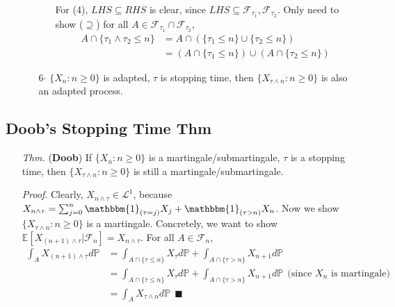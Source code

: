 \documentclass[a4paper,12pt,twoside]{book}
\begin{document}
\begin{itemize}
\begin{itemize}
\begin{itemize}
			For (4), $LHS \subseteq RHS$ is clear, since $LHS \subseteq \mathcal{F}_{\tau_1}, \mathcal{F}_{\tau_2}$. Only need to show ($\supseteq$) for all $A \in \mathcal{F}_{\tau_1}\cap \mathcal{F}_{\tau_2}$, 
			\begin{equation}
				\begin{split}
					A \cap \{\tau_1 \wedge \tau_2\leq n\}&=A \cap (\{\tau_1\leq n\}\cup \{\tau_2\leq n\})\\
					&= (A\cap \{\tau_1\leq n\}) \cup (A\cap\{\tau_2 \leq n\})
				\end{split}
			\end{equation}
		\end{itemize}
		\item[6$\cdot$] $\{X_n: n\geq 0\}$ is adapted, $\tau$ is stopping time, then $\{X_{\tau \wedge n}: n\geq 0\}$ is also an adapted process.
	\end{itemize}
\end{itemize}

\subsection{Doob's Stopping Time Thm}
\begin{itemize}
	\item[\textit{Thm.}] (\textbf{Doob}) If $\{X_n: n\geq 0\}$ is a martingale/submartingale, $\tau$ is a stopping time, then $\{X_{\tau \wedge n}: n\geq 0\}$ is still a martingale/submartingale.

	\item[\textit{Proof}.] Clearly, $X_{n \wedge \tau}\in \mathcal{L}^1$, because $X_{n \wedge \tau}=\sum_{j=0}^n \mathbbm{1}_{(\tau=j)}X_j+\mathbbm{1}_{(\tau>n)}X_n$. Now we show $\{X_{\tau \wedge n}: n\geq 0\}$ is a martingale. Concretely, we want to show $\mathbb{E}\left[X_{(n+1)\wedge \tau}|\mathcal{F}_n\right]=X_{n \wedge \tau}$. For all $A \in \mathcal{F}_n$,
	\begin{equation}
		\begin{split}
			\int_A X_{(n+1) \wedge \tau} d\mathbb{P} &= \int_{A\cap \{\tau\leq n\}} X_{\tau} d\mathbb{P} + \int_{A \cap \{\tau>n\}} X_{n+1} d\mathbb{P}\\
			&= \int_{A\cap \{\tau\leq n\}} X_{\tau} d\mathbb{P} + \int_{A \cap \{\tau>n\}} X_{n+1} d\mathbb{P}~~\text{(since $X_n$ is martingale)}\\
			&= \int_A X_{\tau \wedge n} d\mathbb{P}~~\blacksquare
		\end{split}
	\end{equation}
\end{itemize}
\end{document}
